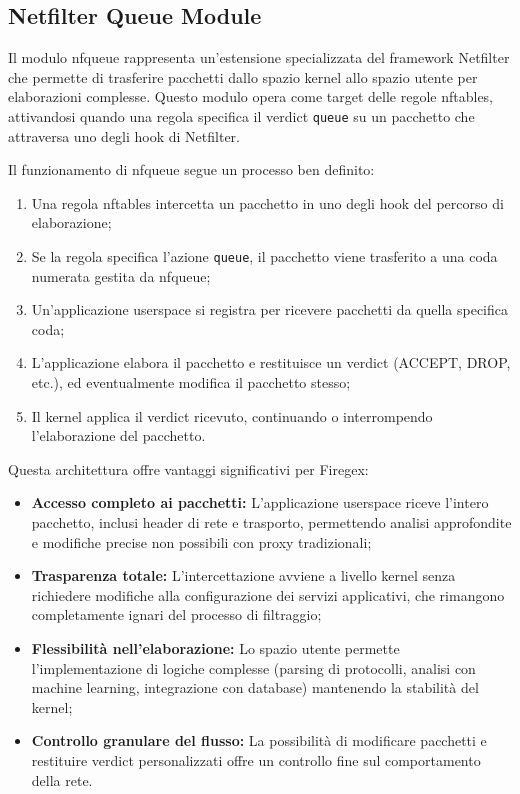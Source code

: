 \subsection{Netfilter Queue Module}

Il modulo \gls{nfqueue} rappresenta un'estensione specializzata del framework Netfilter che permette di trasferire pacchetti dallo spazio kernel allo spazio utente per elaborazioni complesse. Questo modulo opera come target delle regole \gls{nftables}, attivandosi quando una regola specifica il verdict \texttt{queue} su un pacchetto che attraversa uno degli hook di Netfilter.

Il funzionamento di \gls{nfqueue} segue un processo ben definito:

\begin{enumerate}
    \setlength{\itemsep}{1pt}
    \setlength{\parskip}{1pt}
    \item Una regola \gls{nftables} intercetta un pacchetto in uno degli hook del percorso di elaborazione;
    \item Se la regola specifica l'azione \texttt{queue}, il pacchetto viene trasferito a una coda numerata gestita da \gls{nfqueue};
    \item Un'applicazione userspace si registra per ricevere pacchetti da quella specifica coda;
    \item L'applicazione elabora il pacchetto e restituisce un verdict (ACCEPT, DROP, etc.), ed eventualmente modifica il pacchetto stesso;
    \item Il kernel applica il verdict ricevuto, continuando o interrompendo l'elaborazione del pacchetto.
\end{enumerate}

Questa architettura offre vantaggi significativi per Firegex:

\begin{itemize}
    \setlength{\itemsep}{1pt}
    \setlength{\parskip}{1pt}
    \item \textbf{Accesso completo ai pacchetti:} L'applicazione userspace riceve l'intero pacchetto, inclusi header di rete e trasporto, permettendo analisi approfondite e modifiche precise non possibili con proxy tradizionali;

    \item \textbf{Trasparenza totale:} L'intercettazione avviene a livello kernel senza richiedere modifiche alla configurazione dei servizi applicativi, che rimangono completamente ignari del processo di filtraggio;

    \item \textbf{Flessibilità nell'elaborazione:} Lo spazio utente permette l'implementazione di logiche complesse (parsing di protocolli, analisi con machine learning, integrazione con database) mantenendo la stabilità del kernel;

    \item \textbf{Controllo granulare del flusso:} La possibilità di modificare pacchetti e restituire verdict personalizzati offre un controllo fine sul comportamento della rete.
\end{itemize}

